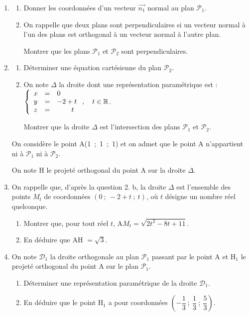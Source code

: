 \documentclass[10pt]{article}
\providecommand{\R}{\mathbb{R}}
\providecommand{\vect}[1]{\overrightarrow{#1}}
\begin{document}
\begin{enumerate}
\item 
	\begin{enumerate}
		\item Donner les coordonnées d'un vecteur $\vect{n_1}$ normal au plan $\mathcal{P}_1$.
		\item On rappelle que deux plans sont perpendiculaires si un vecteur normal à l'un des plans est orthogonal à un vecteur normal à l'autre plan.
		
Montrer que les plans $\mathcal{P}_1$ et $\mathcal{P}_2$ sont perpendiculaires. 
	\end{enumerate}
\item 
	\begin{enumerate}
		\item Déterminer une équation cartésienne du plan $\mathcal{P}_2$.

		\item On note $\Delta$ la droite dont une représentation paramétrique est : $\left\{\begin{array}{l c l}
x&=&0\\y &=& -2 + t\\ z&=&\phantom{2+t}t
\end{array}\right.,\quad t \in  \R$.

Montrer que la droite $\Delta$ est l'intersection des plans $\mathcal{P}_1$ et $\mathcal{P}_2$.
	\end{enumerate}
On considère le point A(1~;~1~;~1) et on admet que le point A n'appartient ni à $\mathcal{P}_1$ ni à $\mathcal{P}_2$.

On note H le projeté orthogonal du point A sur la droite $\Delta$.
\item On rappelle que, d'après la question 2. b, la droite $\Delta$ est l'ensemble des points $M_t$ de coordonnées $(0~;~-2 + t~;~t)$, où $t$ désigne un nombre réel quelconque.
	\begin{enumerate}
		\item Montrer que, pour tout réel $t$,\: A$M_t = \sqrt{2t^2 - 8t + 11}$.
		\item En déduire que AH $= \sqrt 3$.
	\end{enumerate}
\item On note $\mathcal{D}_1$ la droite orthogonale au plan $\mathcal{P}_1$ passant par le point A et H$_1$ le projeté orthogonal du point A sur le plan $\mathcal{P}_1$.
	\begin{enumerate}
		\item Déterminer une représentation paramétrique de la droite $\mathcal{D}_1$.
		\item En déduire que le point H$_1$ a pour coordonnées $\left(- \dfrac13~;~\dfrac13~;~\dfrac53\right)$.
	\end{enumerate}
\end{enumerate}
\end{document}

